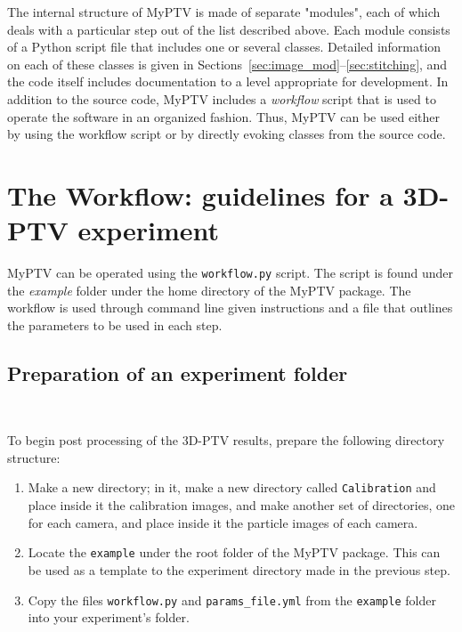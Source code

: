 \documentclass[10pt,a4paper]{article}
\begin{document}
The internal structure of MyPTV is made of separate "modules", each of which deals with a particular step out of the list described above. Each module consists of a Python script file that includes one or several classes. Detailed information on each of these classes is given in Sections~\ref{sec:image_mod}--\ref{sec:stitching}, and the code itself includes documentation to a level appropriate for development. In addition to the source code, MyPTV includes a \textit{workflow} script that is used to operate the software in an organized fashion. Thus, MyPTV can be used either by using the workflow script or by directly evoking classes from the source code. 







\clearpage



\section{The Workflow: guidelines for a 3D-PTV experiment}\label{sec:workflow}


MyPTV can be operated using the \texttt{workflow.py} script. The script is found under the \textit{example} folder under the home directory of the MyPTV package. The workflow is used through command line given instructions and a file that outlines the parameters to be used in each step.





\subsection{Preparation of an experiment folder}~\label{sec:workflow_exp_folder}

To begin post processing of the 3D-PTV results, prepare the following directory structure:

\begin{enumerate}
	\item Make a new directory; in it, make a new directory called \texttt{Calibration} and place inside it the calibration images, and make another set of directories, one for each camera, and place inside it the particle images of each camera.
	\item Locate the \texttt{example} under the root folder of the MyPTV package. This can be used as a template to the experiment directory made in the previous step.
	\item Copy the files \texttt{workflow.py} and \texttt{params\_file.yml} from the \texttt{example} folder into your experiment's folder.
\end{enumerate}
\end{document}
